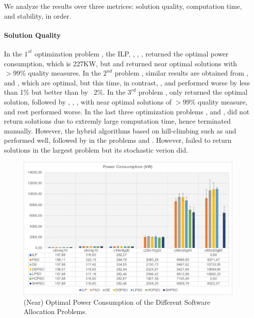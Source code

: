 We analyze the results over three metrices: solution quality, computation time, and stability, in order.

\paragraph{Solution Quality} In the $1^{st}$ optimization problem  , the ILP, \de, \lpso, \hcpso, \shpso{} returned the optimal power consumption, which is 227KW, but \depso{} and \pso{} returned near optimal solutions with $>99\%$ quality measures. In the $2^{nd}$ problem  , similar results are obtained from  \ilp , \hcpso{} and \shpso, which are optimal, but this time, in contrast, \de, \lpso{} and \depso{} performed worse by less than 1\% but better than \pso{} by ~2\%.  In the $3^{rd}$ problem , only \ilp{} returned the optimal solution, followed by \depso, \lpso, \hcpso, \shpso{} with near optimal solutions of $>99\%$ quality measure, and rest performed worse. In the last three optimization problems ,  and  , \ilp did not return solutions due to extremly large computation time, hence terminated manually. However, the hybrid algorithms based on hill-climbing such as \hcpso{} and \shpso{} performed well, followed by \depso{} in the problems  and  . However, \hcpso{} failed to return solutions in the largest problem  but its stochastic verion \shpso{} did.
\begin{figure}
\centering
\includegraphics[width=1\linewidth]{img/power_consumption.pdf}
\caption{(Near) Optimal Power Consumption of the Different Software Allocation Problems.}
\label{fig_powerconsumption_ilp_metaheuristic}\vspace{-0.4cm}
\end{figure}

